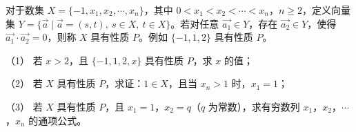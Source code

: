 \begin{question}
对于数集 $X=\{-1,x_1,x_2,\cdots,x_n\}$，其中 $0<x_1<x_2<\cdots<x_n$，$n\geqslant2$，定义向量集 $Y=\{\overrightarrow a\mid\overrightarrow a=(s,t),\ s\in X,\ t\in X\}$。若对任意 $\overrightarrow{a_1}\in Y$，存在 $\overrightarrow{a_2}\in Y$，使得 $\overrightarrow{a_1}\cdot\overrightarrow{a_2}=0$，则称 $X$ 具有性质 $P$。例如 $\{-1,1,2\}$ 具有性质 $P$。

（1） 若 $x>2$，且 $\{-1,1,2,x\}$ 具有性质 $P$，求 $x$ 的值；

（2） 若 $X$ 具有性质 $P$，求证：$1\in X$，且当 $x_n>1$ 时，$x_1=1$；

（3） 若 $X$ 具有性质 $P$，且 $x_1=1$，$x_2=q$（$q$ 为常数），求有穷数列 $x_1$，$x_2$，$\cdots$，$x_n$ 的通项公式。


\end{question}